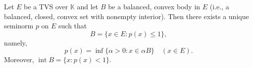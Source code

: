 Let $E$ be a TVS over $\mathbb{K}$ and let $B$ be a balanced, convex body in $E$ (i.e., a balanced, closed, convex set with nonempty interior). Then there exists a unique seminorm $p$ on $E$ such that
$$B = \{x \in E : p(x) \leq 1\},$$
namely,
$$p(x) = \inf\{\alpha > 0 : x \in \alpha B\} \quad (x \in E).$$
Moreover, $\operatorname{int} B = \{x : p(x) < 1\}$.
